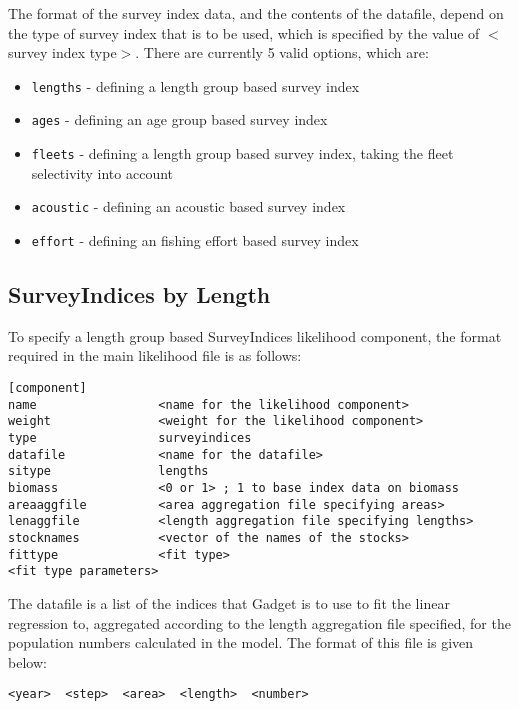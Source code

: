 \documentclass[]{book}
\providecommand{\tightlist}{%
  \setlength{\itemsep}{0pt}\setlength{\parskip}{0pt}}
\begin{document}
The format of the survey index data, and the contents of the datafile,
depend on the type of survey index that is to be used, which is
specified by the value of \(<\)survey index type\(>\). There are currently 5
valid options, which are:

\begin{itemize}
\tightlist
\item
  \texttt{lengths} - defining a length group based survey index
\item
  \texttt{ages} - defining an age group based survey index
\item
  \texttt{fleets} - defining a length group based survey index, taking the fleet selectivity into account
\item
  \texttt{acoustic} - defining an acoustic based survey index
\item
  \texttt{effort} - defining an fishing effort based survey index
\end{itemize}

\hypertarget{subsec:sibylength}{%
\subsection{SurveyIndices by Length}\label{subsec:sibylength}}

To specify a length group based SurveyIndices likelihood component, the
format required in the main likelihood file is as follows:

\begin{verbatim}
[component]
name                 <name for the likelihood component>
weight               <weight for the likelihood component>
type                 surveyindices
datafile             <name for the datafile>
sitype               lengths
biomass              <0 or 1> ; 1 to base index data on biomass
areaaggfile          <area aggregation file specifying areas>
lenaggfile           <length aggregation file specifying lengths>
stocknames           <vector of the names of the stocks>
fittype              <fit type>
<fit type parameters>
\end{verbatim}

The datafile is a list of the indices that Gadget is to use to fit the
linear regression to, aggregated according to the length aggregation
file specified, for the population numbers calculated in the model. The
format of this file is given below:

\begin{verbatim}
<year>  <step>  <area>  <length>  <number>
\end{verbatim}
\end{document}
